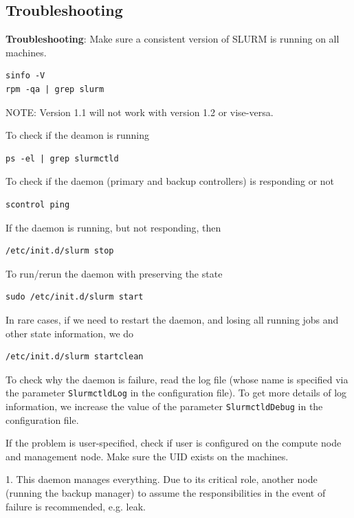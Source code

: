 \subsection{Troubleshooting}

{\bf Troubleshooting}: Make sure a consistent version of SLURM is running on all
machines.
\begin{verbatim}
sinfo -V
rpm -qa | grep slurm
\end{verbatim}
NOTE: Version 1.1 will not work with version 1.2 or vise-versa. 
 
To check if the deamon is running
\begin{verbatim}
ps -el | grep slurmctld
\end{verbatim}

To check if the daemon (primary and backup controllers) is responding or not
\begin{verbatim}
scontrol ping
\end{verbatim}

If the daemon is running, but not responding, then
\begin{verbatim}
/etc/init.d/slurm stop
\end{verbatim}

To run/rerun the daemon with preserving the state
\begin{verbatim}
sudo /etc/init.d/slurm start
\end{verbatim}

In rare cases, if we need to restart the daemon, and losing all running jobs and
other state information, we do
\begin{verbatim}
/etc/init.d/slurm startclean
\end{verbatim}

To check why the daemon is failure, read the log file (whose name is specified
via the parameter \verb!SlurmctldLog! in the configuration file). To get more
details of log information, we increase the value of the parameter
\verb!SlurmctldDebug! in the configuration file. 

If the problem is user-specified, check if user is configured on the compute
node and management node. Make sure the UID exists on the machines. 


1. This daemon manages everything. Due to its
critical role, another node (running the backup manager) to assume the
responsibilities in the event of failure is recommended, e.g. leak.


